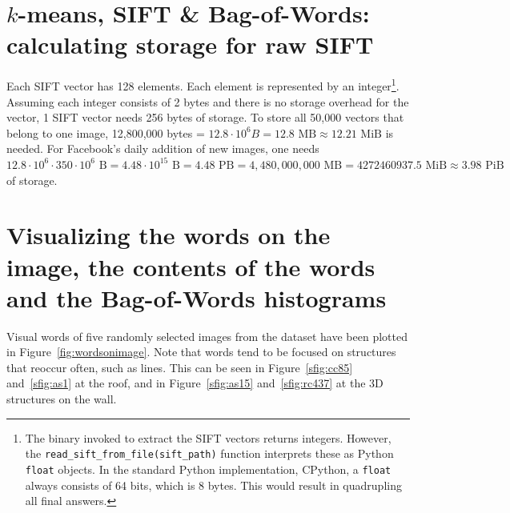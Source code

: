 \documentclass[a4paper,10pt]{article}
\begin{document}
\section{$k$-means, SIFT \& Bag-of-Words: calculating storage for raw SIFT}
Each SIFT vector has 128 elements.  Each element is represented by an integer\footnote{The binary invoked to extract the SIFT vectors returns integers.  However, the \texttt{read\_sift\_from\_file(sift\_path)} function interprets these as Python \texttt{float} objects.  In the standard Python implementation, CPython, a \texttt{float} always consists of 64 bits, which is 8 bytes.  This would result in quadrupling all final answers.}.  Assuming each integer consists of 2 bytes and there is no storage overhead for the vector, 1 SIFT vector needs 256 bytes of storage.  To store all 50,000 vectors that belong to one image, 12,800,000 bytes = $12.8 \cdot 10^6 B = 12.8 \mbox{ MB} \approx 12.21 \mbox{ MiB}$ is needed.  For Facebook's daily addition of new images, one needs $12.8 \cdot 10^6 \cdot 350 \cdot 10^6 \mbox{ B} = 4.48 \cdot 10^{15} \mbox{ B} = 4.48 \mbox{ PB} = 4,480,000,000 \mbox{ MB} = 4272460937.5 \mbox{ MiB} \approx 3.98 \mbox{ PiB}$ of storage.

\section{Visualizing the words on the image, the contents of the words and the Bag-of-Words histograms}
Visual words of five randomly selected images from the dataset have been plotted in Figure~\ref{fig:wordsonimage}.  Note that words tend to be focused on structures that reoccur often, such as lines.  This can be seen in Figure~\ref{sfig:cc85} and~\ref{sfig:as1} at the roof, and in Figure~\ref{sfig:as15} and~\ref{sfig:rc437} at the 3D structures on the wall.
\end{document}
